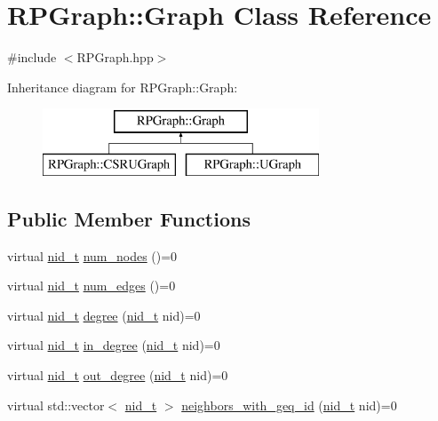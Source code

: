 \hypertarget{classRPGraph_1_1Graph}{}\section{R\+P\+Graph\+:\+:Graph Class Reference}
\label{classRPGraph_1_1Graph}


{\ttfamily \#include $<$R\+P\+Graph.\+hpp$>$}

Inheritance diagram for R\+P\+Graph\+:\+:Graph\+:\begin{figure}[H]
\begin{center}
\leavevmode
\includegraphics[height=2.000000cm]{classRPGraph_1_1Graph}
\end{center}
\end{figure}
\subsection*{Public Member Functions}
\begin{DoxyCompactItemize}
\item 
virtual \mbox{\hyperlink{namespaceRPGraph_ab3ae34f1ab88e48f43794c30c8697b74}{nid\+\_\+t}} \mbox{\hyperlink{classRPGraph_1_1Graph_ab5602e6b776a0ea3b944775331fcb2aa}{num\+\_\+nodes}} ()=0
\item 
virtual \mbox{\hyperlink{namespaceRPGraph_ab3ae34f1ab88e48f43794c30c8697b74}{nid\+\_\+t}} \mbox{\hyperlink{classRPGraph_1_1Graph_acd3b877216686aff2f7fbc2d62bcdf9b}{num\+\_\+edges}} ()=0
\item 
virtual \mbox{\hyperlink{namespaceRPGraph_ab3ae34f1ab88e48f43794c30c8697b74}{nid\+\_\+t}} \mbox{\hyperlink{classRPGraph_1_1Graph_a8a95d1f403c3d9860cf7399abc820c7d}{degree}} (\mbox{\hyperlink{namespaceRPGraph_ab3ae34f1ab88e48f43794c30c8697b74}{nid\+\_\+t}} nid)=0
\item 
virtual \mbox{\hyperlink{namespaceRPGraph_ab3ae34f1ab88e48f43794c30c8697b74}{nid\+\_\+t}} \mbox{\hyperlink{classRPGraph_1_1Graph_ab75e19f698a4ab99e37593c7178f2c1a}{in\+\_\+degree}} (\mbox{\hyperlink{namespaceRPGraph_ab3ae34f1ab88e48f43794c30c8697b74}{nid\+\_\+t}} nid)=0
\item 
virtual \mbox{\hyperlink{namespaceRPGraph_ab3ae34f1ab88e48f43794c30c8697b74}{nid\+\_\+t}} \mbox{\hyperlink{classRPGraph_1_1Graph_a660ad58e03df7e3cc00d0eb4e5c16819}{out\+\_\+degree}} (\mbox{\hyperlink{namespaceRPGraph_ab3ae34f1ab88e48f43794c30c8697b74}{nid\+\_\+t}} nid)=0
\item 
virtual std\+::vector$<$ \mbox{\hyperlink{namespaceRPGraph_ab3ae34f1ab88e48f43794c30c8697b74}{nid\+\_\+t}} $>$ \mbox{\hyperlink{classRPGraph_1_1Graph_ab1e27e4268d36443a5db035fa7635cad}{neighbors\+\_\+with\+\_\+geq\+\_\+id}} (\mbox{\hyperlink{namespaceRPGraph_ab3ae34f1ab88e48f43794c30c8697b74}{nid\+\_\+t}} nid)=0
\end{DoxyCompactItemize}



